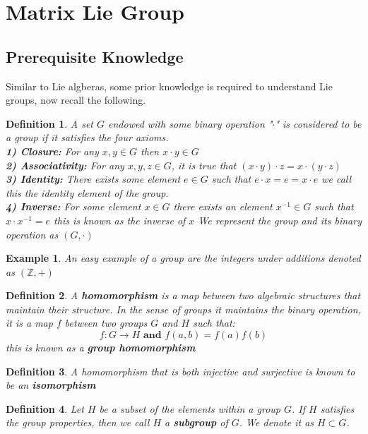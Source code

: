 \documentclass[12pt, letterpaper]{article}
\newcommand{\Z}{\mathbb{Z}}
\newtheorem*{defn}{Definition}
\newtheorem{ex}[thm]{Example}
\begin{document}
\section{Matrix Lie Group}
\subsection{Prerequisite Knowledge}
Similar to Lie algberas, some prior knowledge is required to understand Lie groups, now recall the following.
\begin{defn}
A set $G$ endowed with some binary operation "$\cdot$" is considered to be a group if it satisfies the four axioms.\\
\textbf{1) Closure:} For any $x,y \in G$ then $x\cdot y \in G$\\
\textbf{2) Associativity:} For any $x,y,z \in G$, it is true that $(x \cdot y) \cdot z = x \cdot (y \cdot z)$\\
\textbf{3) Identity:} There exists some element $e \in G$ such that $e \cdot x = e = x \cdot e$ we call this the identity element of the group. \\
\textbf{4) Inverse:} For some element $x \in G$ there exists an element $x^{-1} \in G$ such that $x \cdot x^{-1} = e$ this is known as the inverse of $x$
We represent the group and its binary operation as $(G, \cdot)$
\end{defn}

\begin{ex}
An easy example of a group are the integers under additions denoted as $(\Z, +)$
\end{ex}


\begin{defn}
A \textbf{homomorphism} is a map between two algebraic structures that maintain their structure. In the sense of groups it maintains the binary operation, it is a map $f$ between two groups $G$ and $H$ such that:
\[ f: G \rightarrow H \textbf{ and } f(a,b) = f(a)f(b) \]
this is known as a \textbf{group homomorphism}
\end{defn}

\begin{defn}
A homomorphism that is both injective and surjective is known to be an \textbf{isomorphism}
\end{defn}

\begin{defn}
Let $H$ be a subset of the elements within a group $G$. If $H$ satisfies the group properties, then we call $H$ a \textbf{subgroup} of $G$. We denote it as $H \subset G$.
\end{defn}
\end{document}
